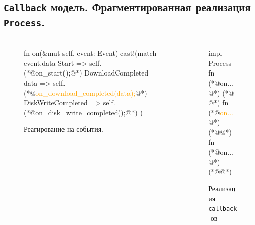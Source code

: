 \documentclass[t]{beamer}  %
\begin{document}
	\subsection{\texttt{Callback} модель. Фрагментированная реализация \texttt{Process}.}
	\begin{frame}[fragile]
		\frametitle{\insertsection} 
		\framesubtitle{\insertsubsection}
		\begin{columns}[c] 
			\begin{column}{0.73\textwidth} %
		\begin{figure}
			\scriptsize
			\centering
			\begin{rustcode}[escapeinside={(*@}{@*)}]
fn on(&mut self, event: Event) {
  cast!(match event.data {
    Start {} => {
      self.(*@\footnotesize\textcolor{OldHSEblue}{on\_start();}@*)
    }
    DownloadCompleted {data} => {
      self.(*@\footnotesize\textcolor{orange}{on\_download\_completed(data);}@*)
    }
    DiskWriteCompleted => {
      self.(*@\footnotesize\textcolor{HSEgreen}{on\_disk\_write\_completed();}@*)
    }
  })
}
			\end{rustcode}
			\caption*{Реагирование на события.}
		\end{figure}

	\end{column}
	
	\begin{column}[c]{0.24\textwidth}
		\begin{figure}
			\scriptsize
			\centering
			\begin{rustcode}[escapeinside={(*@}{@*)}]
impl Process {
  fn (*@\footnotesize\textcolor{OldHSEblue}{on...}@*) {
    (*@\tikz{\node[draw, fill=OldHSEblue, rounded corners, minimum width=1.5em, minimum height=1.5em] {};}
	@*)
  }
  fn (*@\footnotesize\textcolor{orange}{on...}@*) {
    (*@\tikz{\node[draw, fill=orange, rounded corners, minimum width=1.5em, minimum height=1.5em] {};}@*)
  }
  fn (*@\footnotesize\textcolor{HSEgreen}{on...}@*) {
    (*@\tikz{\node[draw, fill=HSEgreen, rounded corners, minimum width=1.5em, minimum height=1.5em] {};}@*)
  }
}
			\end{rustcode}
			\caption*{Реализация \texttt{callback}-ов}
		\end{figure}
	\end{column}
	\end{columns}

	\end{frame}
\end{document}
